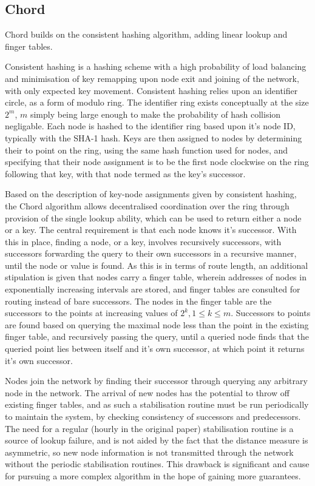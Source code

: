 \documentclass[10pt, a4paper]{article}
\begin{document}
\subsection{Chord}

Chord builds on the consistent hashing algorithm, adding linear lookup and finger tables.

Consistent hashing is a hashing scheme with a high probability of load balancing and minimisation of key remapping upon node exit and joining of the network, with only  expected key movement.
Consistent hashing relies upon an identifier circle, as a form of modulo ring.
The identifier ring exists conceptually at the size $2^m$, $m$ simply being large enough to make the probability of hash collision negligable.
Each node is hashed to the identifier ring based upon it's node ID, typically with the SHA-1 hash.
Keys are then assigned to nodes by determining their to point on the ring, using the same hash function used for nodes, and specifying that their node assignment is to be the first node clockwise on the ring following that key, with that node termed as the key's successor.

Based on the description of key-node assignments given by consistent hashing, the Chord algorithm allows decentralised coordination over the ring through provision of the single lookup ability, which can be used to return either a node or a key.
The central requirement is that each node knows it's successor.
With this in place, finding a node, or a key, involves recursively successors, with successors forwarding the query to their own successors in a recursive manner, until the node or value is found.
As this is  in terms of route length, an additional stipulation is given that nodes carry a finger table, wherein addresses of nodes in exponentially increasing intervals are stored, and finger tables are consulted for routing instead of bare successors.
The nodes in the finger table are the successors to the points at increasing values of $2^k, 1 \leq k \leq m$.
Successors to points are found based on querying the maximal node less than the point in the existing finger table, and recursively passing the query, until a queried node finds that the queried point lies between itself and it's own successor, at which point it returns it's own successor.

Nodes join the network by finding their successor through querying any arbitrary node in the network.
The arrival of new nodes has the potential to throw off existing finger tables, and as such a stabilisation routine must be run periodically to maintain the system, by checking consistency of successors and predecessors.
The need for a regular (hourly in the original paper) stabilisation routine is a source of lookup failure, and is not aided by the fact that the distance measure is asymmetric, so new node information is not transmitted through the network without the periodic stabilisation routines.
This drawback is significant and cause for pursuing a more complex algorithm in the hope of gaining more guarantees.
\end{document}
